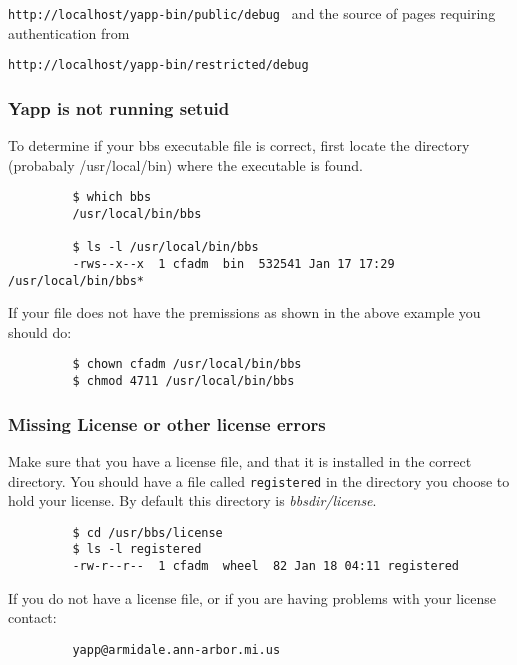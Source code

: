 \documentclass[twoside]{report}
\begin{document}
{\tt http://localhost/yapp-bin/public/debug } 
         and the source of pages requiring authentication from  

         {\tt http://localhost/yapp-bin/restricted/debug }

         \subsubsection{Yapp is not running setuid}
            To determine if your bbs executable file is correct, first 
            locate the directory (probabaly /usr/local/bin) where the
            executable is found.
       
         \begin{verbatim}
         $ which bbs
         /usr/local/bin/bbs

         $ ls -l /usr/local/bin/bbs
         -rws--x--x  1 cfadm  bin  532541 Jan 17 17:29 /usr/local/bin/bbs*
         \end{verbatim}

            If your file does not have the premissions as shown in the above
            example you should do:

         \begin{verbatim}
         $ chown cfadm /usr/local/bin/bbs
         $ chmod 4711 /usr/local/bin/bbs
         \end{verbatim}

         \subsubsection{Missing License or other license errors}
            Make sure that you have a license file, and that
            it is installed in the correct directory.  You should have
            a file called {\tt registered} in the directory you choose
            to hold your license.  By default this directory is 
            {\em{bbsdir}/license}.


         \begin{verbatim}
         $ cd /usr/bbs/license 
         $ ls -l registered 
         -rw-r--r--  1 cfadm  wheel  82 Jan 18 04:11 registered
         \end{verbatim}

             If you do not have a license file, or if you are
             having problems with your license contact:
         \begin{verbatim}
         yapp@armidale.ann-arbor.mi.us
         \end{verbatim}
\end{document}
